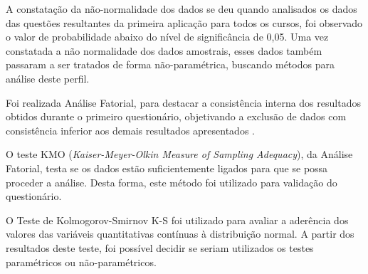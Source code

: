 A constatação da não-normalidade dos dados se deu quando
analisados os dados das questões resultantes da primeira aplicação para todos os cursos, foi observado o valor de probabilidade abaixo do nível de significância de 0,05. Uma vez constatada a não normalidade dos dados amostrais, esses dados também passaram a ser tratados de forma não-paramétrica, buscando métodos para análise deste perfil. 

Foi realizada Análise Fatorial, para destacar a consistência interna dos resultados obtidos durante o primeiro questionário, objetivando a exclusão de dados com consistência inferior aos demais resultados apresentados . 

O teste KMO (\textit{Kaiser-Meyer-Olkin Measure of Sampling Adequacy}), da Análise Fatorial, testa se os dados estão suficientemente ligados para que se possa proceder a análise. Desta forma, este método foi utilizado para validação do questionário.

O Teste de Kolmogorov-Smirnov K-S foi utilizado para avaliar a aderência dos valores das variáveis quantitativas contínuas à  distribuição  normal.  A  partir  dos  resultados  deste  teste,  foi  possível  decidir  se  seriam  utilizados  os  testes  paramétricos  ou  não-paramétricos.  









